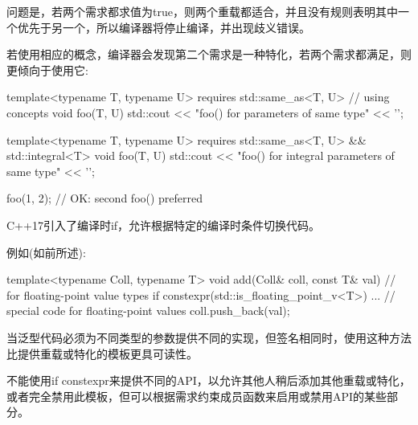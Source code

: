 问题是，若两个需求都求值为true，则两个重载都适合，并且没有规则表明其中一个优先于另一个，所以编译器将停止编译，并出现歧义错误。

若使用相应的概念，编译器会发现第二个需求是一种特化，若两个需求都满足，则更倾向于使用它:

\begin{cpp}
template<typename T, typename U>
requires std::same_as<T, U> // using concepts
void foo(T, U)
{
	std::cout << "foo() for parameters of same type" << '\n';
}

template<typename T, typename U>
requires std::same_as<T, U> && std::integral<T>
void foo(T, U)
{
	std::cout << "foo() for integral parameters of same type" << '\n';
}

foo(1, 2); // OK: second foo() preferred
\end{cpp}


C++17引入了编译时if，允许根据特定的编译时条件切换代码。

例如(如前所述):

\begin{cpp}
template<typename Coll, typename T>
void add(Coll& coll, const T& val) // for floating-point value types
{
	if constexpr(std::is_floating_point_v<T>) {
		... // special code for floating-point values
	}
	coll.push_back(val);
}
\end{cpp}

当泛型代码必须为不同类型的参数提供不同的实现，但签名相同时，使用这种方法比提供重载或特化的模板更具可读性。

不能使用if constexpr来提供不同的API，以允许其他人稍后添加其他重载或特化，或者完全禁用此模板，但可以根据需求约束成员函数来启用或禁用API的某些部分。








